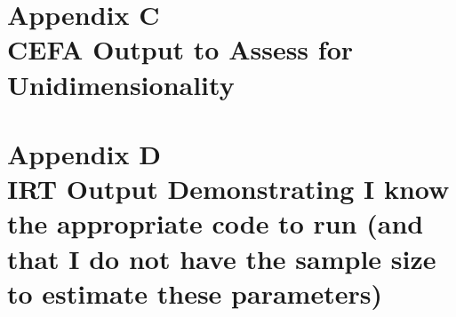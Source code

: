 \documentclass[12pt]{article} %
\begin{document}
  \newpage
  \section*{\centering\normalsize\textnormal{Appendix C\\ CEFA Output to Assess for Unidimensionality}}
  
  
  \newpage
  \section*{\centering\normalsize\textnormal{Appendix D\\ IRT Output Demonstrating I know the appropriate code to run (and that I do not have the sample size to estimate these parameters)}}
\end{document}
